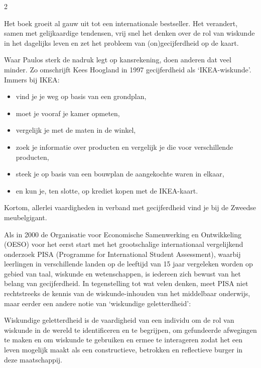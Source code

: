  \begin{multicols}{2}


Het boek groeit al gauw uit tot een internationale bestseller. Het verandert, samen met gelijkaardige tendensen, vrij snel het denken over de rol van wiskunde in het dagelijks leven en zet het probleem van (on)gecijferdheid op de kaart.

Waar Paulos sterk de nadruk legt op kansrekening, doen anderen dat veel minder. Zo omschrijft Kees Hoogland in 1997 gecijferdheid als ‘IKEA-wiskunde’. Immers bij IKEA:
\begin{itemize}
    \item vind je je weg op basis van een grondplan, 
    \item moet je vooraf je kamer opmeten,
    \item vergelijk je met de maten in de winkel, 
    \item zoek je informatie over producten en vergelijk je die voor verschillende producten,
    \item steek je op basis van een bouwplan de aangekochte waren in elkaar,
    \item en kun je, ten slotte, op krediet kopen met de IKEA-kaart.
\end{itemize}

Kortom, allerlei vaardigheden in verband met gecijferdheid vind je bij de Zweedse meubelgigant. 

Als in 2000 de Organisatie voor Economische Samenwerking en Ontwikkeling (OESO) voor het eerst start met het grootschalige internationaal vergelijkend onderzoek PISA (Programme for International Student Assessment), waarbij leerlingen in verschillende landen op de leeftijd van 15 jaar vergeleken worden op gebied van taal, wiskunde en wetenschappen, is iedereen zich bewust van het belang van gecijferdheid. In tegenstelling tot wat velen denken, meet PISA niet rechtstreeks de kennis van de wiskunde-inhouden van het middelbaar onderwijs, maar eerder een andere notie van `wiskundige geletterdheid’:
\begin{citaat} 
    Wiskundige geletterdheid is de vaardigheid van een individu om de rol van wiskunde in de wereld te identificeren en te begrijpen, om gefundeerde afwegingen te maken en om wiskunde te gebruiken en ermee te interageren zodat het een leven mogelijk maakt als een constructieve, betrokken en reflectieve burger in deze maatschappij.
\end{citaat}


\end{multicols}
